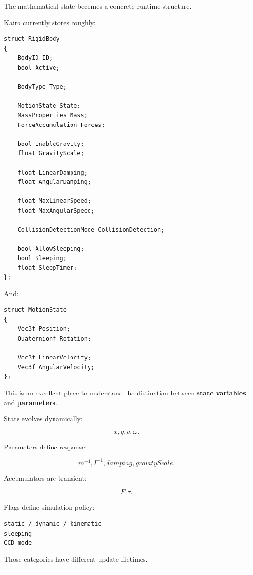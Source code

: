 \hypertarget{06-engine-ii-ch037-part-1651-rigid-body-state-structure-in-memory}{}

The mathematical state becomes a concrete runtime structure.

Kairo currently stores roughly:

\begin{verbatim}
struct RigidBody
{
    BodyID ID;
    bool Active;

    BodyType Type;

    MotionState State;
    MassProperties Mass;
    ForceAccumulation Forces;

    bool EnableGravity;
    float GravityScale;

    float LinearDamping;
    float AngularDamping;

    float MaxLinearSpeed;
    float MaxAngularSpeed;

    CollisionDetectionMode CollisionDetection;

    bool AllowSleeping;
    bool Sleeping;
    float SleepTimer;
};
\end{verbatim}

And:

\begin{verbatim}
struct MotionState
{
    Vec3f Position;
    Quaternionf Rotation;

    Vec3f LinearVelocity;
    Vec3f AngularVelocity;
};
\end{verbatim}

This is an excellent place to understand the distinction between \textbf{state variables} and \textbf{parameters}.

State evolves dynamically:

\[
x,q,v,\omega.
\]

Parameters define response:

\[
m^{-1},I^{-1},damping,gravityScale.
\]

Accumulators are transient:

\[
F,\tau.
\]

Flags define simulation policy:

\begin{verbatim}
static / dynamic / kinematic
sleeping
CCD mode
\end{verbatim}

Those categories have different update lifetimes.

\begin{center}\rule{0.5\linewidth}{0.5pt}\end{center}

